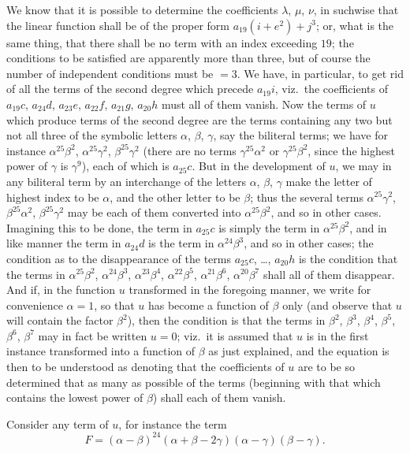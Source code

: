 \documentclass[11pt]{article}
\begin{document}
We know that it is possible to determine the coefficients $\lambda$, $\mu$, $\nu$, in suchwise that the linear function shall be of the proper form $a_{19}(i + e^{2}) + j^{3}$; or, what is the same thing, that there shall be no term with an index exceeding $19$; the conditions to be satisfied are apparently more than three, but of course the number of independent conditions must be $= 3$. We have, in particular, to get rid of all the terms of the second degree which precede $a_{19}i$, viz.\ the coefficients of $a_{19}c$, $a_{24}d$, $a_{23}e$, $a_{22}f$, $a_{21}g$, $a_{20}h$ must all of them vanish. Now the terms of $u$ which produce terms of the second degree are the terms containing any two but not all three of the symbolic letters $\alpha$, $\beta$, $\gamma$, say the biliteral terms; we have for instance $\alpha^{25}\beta^{2}$, $\alpha^{25}\gamma^{2}$, $\beta^{25}\gamma^{2}$ (there are no terms $\gamma^{25}\alpha^{2}$ or $\gamma^{25}\beta^{2}$, since the highest power of $\gamma$ is $\gamma^{9}$), each of which is $a_{25}c$. But in the development of $u$, we may in any biliteral term by an interchange of the letters $\alpha$, $\beta$, $\gamma$ make the letter of highest index to be $\alpha$, and the other letter to be $\beta$; thus the several terms $\alpha^{25}\gamma^{2}$, $\beta^{25}\alpha^{2}$, $\beta^{25}\gamma^{2}$ may be each of them converted into $\alpha^{25}\beta^{2}$, and so in other cases. Imagining this to be done, the term in $a_{25}c$ is simply the term in $\alpha^{25}\beta^{2}$, and in like manner the term in $a_{24}d$ is the term in $\alpha^{24}\beta^{3}$, and so in other cases; the condition as to the disappearance of the terms $a_{25}c$, \dots, $a_{20}h$ is the condition that the terms in $\alpha^{25}\beta^{2}$, $\alpha^{24}\beta^{3}$, $\alpha^{23}\beta^{4}$, $\alpha^{22}\beta^{5}$, $\alpha^{21}\beta^{6}$, $\alpha^{20}\beta^{7}$ shall all of them disappear. And if, in the function $u$ transformed in the foregoing manner, we write for convenience $\alpha = 1$, so that $u$ has become a function of $\beta$ only (and observe that $u$ will contain the factor $\beta^{2}$), then the condition is that the terms in $\beta^{2}$, $\beta^{3}$, $\beta^{4}$, $\beta^{5}$, $\beta^{6}$, $\beta^{7}$ may in fact be written $u = 0$; viz.\ it is assumed that $u$ is in the first instance transformed into a function of $\beta$ as just explained, and the equation is then to be understood as denoting that the coefficients of $u$ are to be so determined that as many as possible of the terms (beginning with that which contains the lowest power of $\beta$) shall each of them vanish.

Consider any term of $u$, for instance the term
\[
F = (\alpha - \beta)^{24}(\alpha + \beta - 2\gamma)(\alpha - \gamma)(\beta - \gamma).
\]
\end{document}
